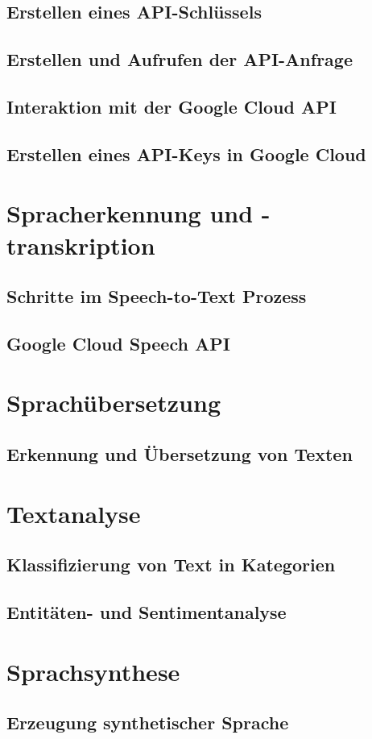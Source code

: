 \documentclass[12pt,a4paper]{article}
\begin{document}
\subsection{Erstellen eines API-Schlüssels}
\subsection{Erstellen und Aufrufen der API-Anfrage}
\subsection{Interaktion mit der Google Cloud API}
\subsection{Erstellen eines API-Keys in Google Cloud}


\newpage
\section{Spracherkennung und -transkription}
\subsection{Schritte im Speech-to-Text Prozess}
\subsection{Google Cloud Speech API}


\newpage

\section{Sprachübersetzung}
\subsection{Erkennung und Übersetzung von Texten}

\newpage

\section{Textanalyse}
\subsection{Klassifizierung von Text in Kategorien}
\subsection{Entitäten- und Sentimentanalyse}

\newpage

\section{Sprachsynthese}
\subsection{Erzeugung synthetischer Sprache}

\newpage
	
\end{document}
